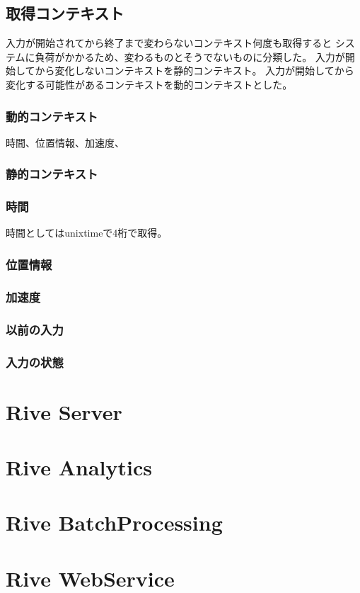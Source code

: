 \subsection{取得コンテキスト}

入力が開始されてから終了まで変わらないコンテキスト何度も取得すると
システムに負荷がかかるため、変わるものとそうでないものに分類した。
入力が開始してから変化しないコンテキストを静的コンテキスト。
入力が開始してから変化する可能性があるコンテキストを動的コンテキストとした。

\subsubsection{動的コンテキスト}

時間、位置情報、加速度、

\subsubsection{静的コンテキスト}

\subsubsection{時間}
時間としてはunixtimeで4桁で取得。
\subsubsection{位置情報}
\subsubsection{加速度}
\subsubsection{以前の入力}
\subsubsection{入力の状態}

\subsection{}

\section{Rive Server}

\section{Rive Analytics}

\section{Rive BatchProcessing}

\section{Rive WebService}
